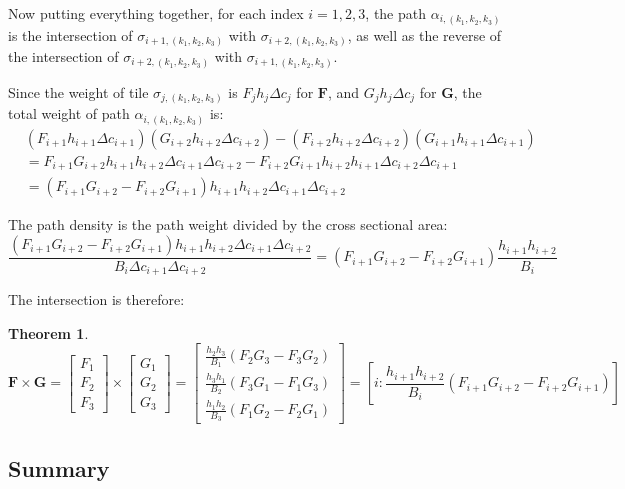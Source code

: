 \documentclass{book}
\newtheorem{thm}{Theorem}
\begin{document}
Now putting everything together, for each index \(i = 1, 2, 3\), the path \(\alpha_{i, (k_1, k_2, k_3)}\) is the intersection of \(\sigma_{i+1, (k_1, k_2, k_3)}\) with \(\sigma_{i+2, (k_1, k_2, k_3)}\), as well as the reverse of the intersection of \(\sigma_{i+2, (k_1, k_2, k_3)}\) with \(\sigma_{i+1, (k_1, k_2, k_3)}\).

Since the weight of tile \(\sigma_{j, (k_1, k_2, k_3)}\) is \(F_j h_j \Delta c_j\) for \(\mathbf{F}\), and \(G_j h_j \Delta c_j\) for \(\mathbf{G}\), the total weight of path \(\alpha_{i, (k_1,k_2,k_3)}\) is: 
\begin{align*}
& (F_{i+1} h_{i+1} \Delta c_{i+1})(G_{i+2} h_{i+2} \Delta c_{i+2}) - (F_{i+2} h_{i+2} \Delta c_{i+2})(G_{i+1} h_{i+1} \Delta c_{i+1}) \\
& = F_{i+1} G_{i+2} h_{i+1} h_{i+2} \Delta c_{i+1} \Delta c_{i+2} - F_{i+2} G_{i+1} h_{i+2} h_{i+1} \Delta c_{i+2} \Delta c_{i+1} \\
& = (F_{i+1} G_{i+2} - F_{i+2} G_{i+1})h_{i+1} h_{i+2} \Delta c_{i+1} \Delta c_{i+2}
\end{align*}

The path density is the path weight divided by the cross sectional area:
\[\frac{(F_{i+1} G_{i+2} - F_{i+2} G_{i+1})h_{i+1} h_{i+2} \Delta c_{i+1} \Delta c_{i+2}}{B_i \Delta c_{i+1} \Delta c_{i+2}} = (F_{i+1} G_{i+2} - F_{i+2} G_{i+1})\frac{h_{i+1} h_{i+2}}{B_i}\]

The intersection is therefore:

\begin{thm}
\[\mathbf{F} \times \mathbf{G} = \begin{bmatrix} F_1 \\ F_2 \\ F_3 \end{bmatrix} \times \begin{bmatrix} G_1 \\ G_2 \\ G_3 \end{bmatrix}
 = \begin{bmatrix} \frac{h_2 h_3}{B_1}(F_2 G_3 - F_3 G_2) \\ \frac{h_3 h_1}{B_2}(F_3 G_1 - F_1 G_3) \\ \frac{h_1 h_2}{B_3}(F_1 G_2 - F_2 G_1) \end{bmatrix}
 = \left[i : \frac{h_{i+1} h_{i+2}}{B_i} (F_{i+1} G_{i+2} - F_{i+2} G_{i+1})\right]\]
\end{thm}



\subsection*{Summary}
\end{document}
